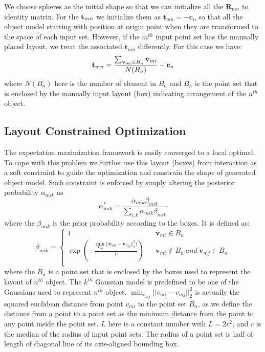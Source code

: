 %
We choose spheres as the initial shape so that we can initialize all the $\mathbf{R}_{mn}$ to identity matrix. 
%
For the $\mathbf{t}_{mn}$ we initialize them as $\mathbf{t}_{mn}=- \mathbf{c}_n$ so that all the object model starting with position at origin point when they are transformed to the space of each input set. 
%
However, if the $m^{th}$ input point set has the manually placed layout, we treat the associated $\mathbf{t}_{mn}$ differently. For this case we have:
\begin{equation}
	\label{equ:initt}
	\mathbf{t}_{mn}=\frac{\sum_{\mathbf{v}_{mi} \in B_n}\mathbf{v}_{mi}}{N(B_n)}-\mathbf{c}_n
\end{equation}
where $N(B_n)$ here is the number of element in $B_n$ and $B_n$ is the point set that is enclosed by the manually input layout (box) indicating arrangement of the $n^{th}$ object.
\subsection{Layout Constrained Optimization}
The expectation maximization framework is easily converged to a local optimal. To cope with this problem we further use this layout (boxes) from interaction as a soft constraint to guide the optimization and constrain the shape of generated object model. Such constraint is enforced by simply altering the posterior probability $\alpha_{mik}$ as
%
\begin{equation}
	\label{equ:alteralpha}
	\alpha_{mik}^*=\frac{\alpha_{mik}\beta_{mik}}{\sum_{i,k}\alpha_{mik}\beta_{mik}}
\end{equation}
where the $\beta_{mik}$ is the prior probability according to the boxes. It is defined as:
\begin{equation}
	\beta_{mik}=\left\{
	\begin{array}{rcl}
		1& &\mathbf v_{mi} \in B_n\\
		\exp(-\frac{\min_{\mathbf v_{mj}}|| \mathbf v_{mi} - \mathbf v_{mj} ||_2^2  )}{L})& &\mathbf v_{mi} \notin B_n~and~\mathbf v_{mj} \in B_n\\
	\end{array} \right.
\end{equation}
where the $B_n$ is a point set that is enclosed by the boxes used to represent the layout of $n^{th}$ object. The $k^{th}$ Gaussian model is predefined to be one of the Gaussians used to represent $n^{th}$ object. $\min_{v_{mj}}|| v_{mi} - v_{mj} ||_2^2$ is actually the squared euclidean distance from point $v_{mi}$ to the point set $B_n$, as we define the distance from a point to a point set as the minimum distance from the point to any point inside the point set. $L$ here is a constant number with $L=2r^2$, and $r$ is the median of the radius of input point sets. The radius of a point set is half of length of diagonal line of its axis-aligned bounding box.   
